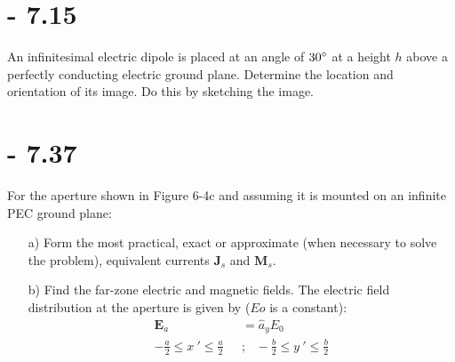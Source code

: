 \documentclass[12pt]{article}
\begin{document}
\section{- 7.15}
An infinitesimal electric dipole is placed at an angle of $30\degree$ at a height $h$ above a perfectly conducting electric ground plane. Determine the location and orientation of its image. Do this by sketching the image.
\begin{center}
\end{center}
\begin{center}
\end{center}
\newpage
\section{- 7.37}
For the aperture shown in Figure 6-4c and assuming it is mounted on an infinite PEC ground plane:
\begin{itemize}
\item [a)] Form the most practical, exact or approximate (when necessary to solve the problem), equivalent currents $\mathbf{J}_s$ and $\mathbf{M}_s$.
\item [b)] Find the far-zone electric and magnetic fields. The electric field distribution at the aperture is given by ($Eo$ is a constant):\\
  \begin{align*}
    \mathbf{E}_a &= \hat a_yE_0\\
    -\frac{a}{2} \le x\ ' \le \frac{a}{2}\ \ \ &;\ \ \ -\frac{b}{2} \le y\ ' \le \frac{b}{2}
  \end{align*}
\end{itemize}
\newpage
\textcolor{white}{  }
\newpage



\end{document}

